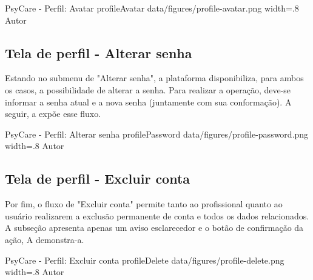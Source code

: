 \image
    {PsyCare - Perfil: Avatar}
    {profileAvatar}
    {data/figures/profile-avatar.png}
    {width=.8\textwidth}
    {Autor}

\subsection{Tela de perfil - Alterar senha}
\label{sec:perfilAvatar}
Estando no submenu de "Alterar senha", a plataforma disponibiliza, para ambos os casos, a possibilidade de alterar a senha. Para realizar a operação, deve-se informar a senha atual e a nova senha (juntamente com sua conformação). A seguir, a  expõe esse fluxo.

\image
    {PsyCare - Perfil: Alterar senha}
    {profilePassword}
    {data/figures/profile-password.png}
    {width=.8\textwidth}
    {Autor}

\subsection{Tela de perfil - Excluir conta}
\label{sec:perfilExcluir}
Por fim, o fluxo de "Excluir conta" permite tanto ao profissional quanto ao usuário realizarem a exclusão permanente de conta e todos os dados relacionados. A subseção apresenta apenas um aviso esclarecedor e o botão de confirmação da ação, A  demonstra-a.

\image
    {PsyCare - Perfil: Excluir conta}
    {profileDelete}
    {data/figures/profile-delete.png}
    {width=.8\textwidth}
    {Autor}